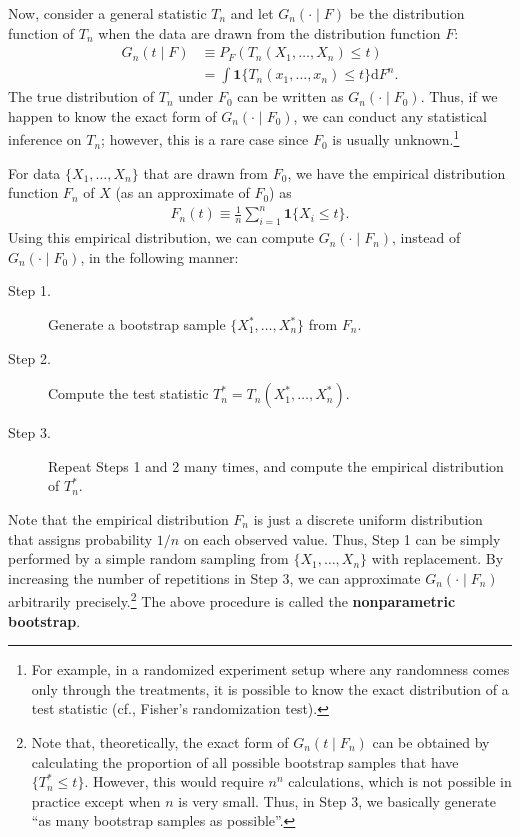 \documentclass[10.5pt, A4paper, openany, uplatex]{book}
\newcommand{\mbf}{\mathbf}
\numberwithin{equation}{section}
\begin{document}
Now, consider a general statistic $T_n$ and let $G_n(\cdot \mid F)$ be the distribution function of $T_n$ when the data are drawn from the distribution function $F$:
\begin{align*}
	G_n(t \mid F) 
	& \equiv P_F(T_n(X_1, \ldots, X_n) \le t) \\
	& = \int \mbf{1}\{T_n(x_1, \ldots, x_n) \le t\} \mathrm{d} F^n.
\end{align*}
The true distribution of $T_n$ under $F_0$ can be written as $G_n(\cdot \mid F_0)$.
Thus, if we happen to know the exact form of $G_n(\cdot \mid F_0)$, we can conduct any statistical inference on $T_n$; however, this is a rare case since $F_0$ is usually unknown.\footnote{
	For example, in a randomized experiment setup where any randomness comes only through the treatments, it is possible to know the exact distribution of a test statistic (cf., Fisher's randomization test).
}

For data $\{X_1, \ldots, X_n\}$ that are drawn from $F_0$, we have the empirical distribution function $F_n$ of $X$ (as an approximate of $F_0$) as
\begin{align*}
	F_n(t) \equiv \frac{1}{n}\sum_{i = 1}^n \mbf{1}\{X_i \le t\}.
\end{align*} 
Using this empirical distribution, we can compute $G_n(\cdot \mid F_n)$, instead of $G_n(\cdot \mid F_0)$, in the following manner:
\begin{description}
	\item[Step 1.] Generate a bootstrap sample $\{X_1^*, \dots, X_n^*\}$ from $F_n$. 
	\item[Step 2.] Compute the test statistic $T_n^* = T_n(X_1^*, \dots, X_n^*)$.
	\item[Step 3.] Repeat Steps 1 and 2 many times, and compute the empirical distribution of $T_n^*$. 
\end{description}
Note that the empirical distribution $F_n$ is just a discrete uniform distribution that assigns probability $1/n$ on each observed value.
Thus, Step 1 can be simply performed by a simple random sampling from $\{X_1, \ldots, X_n\}$ with replacement.
By increasing the number of repetitions in Step 3, we can approximate $G_n(\cdot \mid F_n)$ arbitrarily precisely.\footnote{
	Note that, theoretically, the exact form of $G_n(t \mid F_n)$ can be obtained by calculating the proportion of all possible bootstrap samples that have $\{T_n^* \le t\}$.
	However, this would require $n^n$ calculations, which is not possible in practice except when $n$ is very small.
	Thus, in Step 3, we basically generate ``as many bootstrap samples as possible''.
}
The above procedure is called the \textbf{nonparametric bootstrap}.
\end{document}
